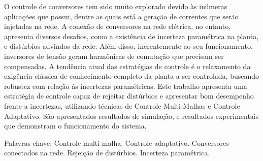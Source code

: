 
	O controle de conversores tem sido muito explorado devido às inúmeras aplicações que possui, dentre as quais está a geração de correntes que serão injetadas na rede. A conexão de conversores na rede elétrica, no entanto, apresenta diversos desafios, como a existência de incerteza paramétrica na planta, e distúrbios advindos da rede. Além disso, inerentemente ao seu funcionamento, inversores de tensão geram harmônicas de comutação que precisam ser compensadas. A tendência atual das estratégias de controle é o relaxamento da exigência clássica de conhecimento completo da planta a ser controlada, buscando robustez com relação às incertezas paramétricas. Este trabalho apresenta uma estratégia de controle capaz de rejeitar distúrbios e apresentar bom desempenho frente a incertezas, utilizando técnicas de Controle Multi-Malhas e Controle Adaptativo. São apresentados resultados de simulação, e resultados experimentais que demonstram o funcionamento do sistema.

 \vspace{\onelineskip}

 \noindent
 Palavras-chave: Controle multi-malha. Controle adaptativo. Conversores conectados na rede. Rejeição de distúrbios. Incerteza paramétrica.
